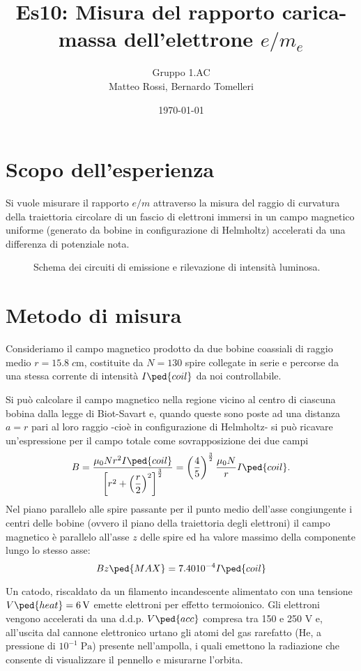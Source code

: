\documentclass[10pt, a4paper, italian]{article}
\author{Gruppo 1.AC \\ Matteo Rossi, Bernardo Tomelleri}
\title{Es10: Misura del rapporto carica-massa dell'elettrone $e/m_e$}
\begin{document}
\date{\today}
\maketitle

\section{Scopo dell'esperienza}
Si vuole misurare il rapporto $e/m$ attraverso la misura del raggio di
curvatura della traiettoria circolare di un fascio di elettroni immersi in un
campo magnetico uniforme (generato da bobine in configurazione di Helmholtz)
accelerati da una differenza di potenziale nota.

\begin{figure}[htbp]
    \centering
    \caption{Schema dei circuiti di emissione e rilevazione di intensità
    luminosa.
    \label{schm: mesctrl}}
\end{figure}

\section{Metodo di misura}
Consideriamo il campo magnetico prodotto da due bobine coassiali di raggio
medio $r = 15.8 \; \si{c\m}$, costituite da $N = 130$ spire collegate in
serie e percorse da una stessa corrente di intensità $I\ped{coil}$ da noi
controllabile.

Si può calcolare il campo magnetico nella regione vicino al centro di ciascuna
bobina dalla legge di Biot-Savart e, quando queste sono poste ad una distanza
$a = r$ pari al loro raggio -cioè in configurazione di Helmholtz- si può
ricavare un'espressione per il campo totale come sovrapposizione dei due campi
\begin{equation}\label{eq: B-helm}
    B = \frac{\mu_0 N r^2 I\ped{coil}}{\left[r^2 + \left(\dfrac{r}{2}\right)^2
    \right]^\frac{3}{2}} =
    \left(\frac{4}{5}\right)^{\frac{3}{2}} \frac{\mu_{0} N}{r} I\ped{coil}.
\end{equation}
Nel piano parallelo alle spire passante per il punto medio dell'asse
congiungente i centri delle bobine (ovvero il piano della traiettoria degli
elettroni) il campo magnetico è parallelo all'asse $z$ delle spire ed ha
valore massimo della componente lungo lo stesso asse:
\[
Bz\ped{MAX} = 7.40 10^{-4} I\ped{coil}
\]

Un catodo, riscaldato da un filamento incandescente alimentato con una
tensione $V\ped{heat} = \SI{6}{\V}$ emette elettroni per effetto termoionico.
Gli elettroni vengono accelerati da una d.d.p. $V\ped{acc}$ compresa tra 150
e 250 V e, all'uscita dal cannone elettronico urtano gli atomi del gas
rarefatto (He, a pressione di $10^{-1} \; \si{\Pa}$) presente nell'ampolla,
i quali emettono la radiazione che consente di visualizzare il pennello e
misurarne l'orbita.
\end{document}
